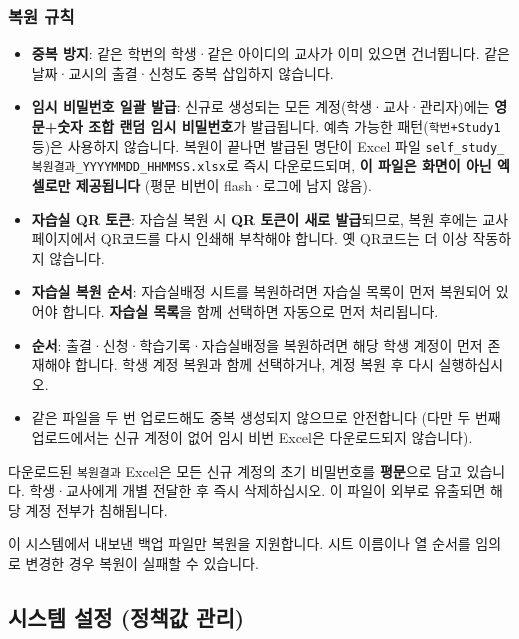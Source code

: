 \documentclass[a4paper,12pt]{article}
\begin{document}
\subsubsection{복원 규칙}

\begin{itemize}[leftmargin=1.5em]
    \item \textbf{중복 방지}: 같은 학번의 학생·같은 아이디의 교사가 이미 있으면 건너뜁니다. 같은 날짜·교시의 출결·신청도 중복 삽입하지 않습니다.
    \item \textbf{임시 비밀번호 일괄 발급}: 신규로 생성되는 모든 계정(학생·교사·관리자)에는
    \textbf{영문+숫자 조합 랜덤 임시 비밀번호}가 발급됩니다. 예측 가능한 패턴(\texttt{학번+Study1}
    등)은 사용하지 않습니다. 복원이 끝나면 발급된 명단이 Excel 파일
    \texttt{self\_study\_복원결과\_YYYYMMDD\_HHMMSS.xlsx}로 즉시 다운로드되며,
    \textbf{이 파일은 화면이 아닌 엑셀로만 제공됩니다} (평문 비번이 flash·로그에 남지 않음).
    \item \textbf{자습실 QR 토큰}: 자습실 복원 시 \textbf{QR 토큰이 새로 발급}되므로,
    복원 후에는 교사 페이지에서 QR코드를 다시 인쇄해 부착해야 합니다.
    옛 QR코드는 더 이상 작동하지 않습니다.
    \item \textbf{자습실 복원 순서}: 자습실배정 시트를 복원하려면 자습실 목록이 먼저 복원되어 있어야 합니다. \textbf{자습실 목록}을 함께 선택하면 자동으로 먼저 처리됩니다.
    \item \textbf{순서}: 출결·신청·학습기록·자습실배정을 복원하려면 해당 학생 계정이 먼저 존재해야 합니다. 학생 계정 복원과 함께 선택하거나, 계정 복원 후 다시 실행하십시오.
    \item 같은 파일을 두 번 업로드해도 중복 생성되지 않으므로 안전합니다 (다만 두 번째 업로드에서는 신규 계정이 없어 임시 비번 Excel은 다운로드되지 않습니다).
\end{itemize}

\begin{warnbox}
  다운로드된 \texttt{복원결과} Excel은 모든 신규 계정의 초기 비밀번호를
  \textbf{평문}으로 담고 있습니다. 학생·교사에게 개별 전달한 후
  즉시 삭제하십시오. 이 파일이 외부로 유출되면 해당 계정 전부가 침해됩니다.
\end{warnbox}

\begin{warnbox}
  이 시스템에서 내보낸 백업 파일만 복원을 지원합니다.
  시트 이름이나 열 순서를 임의로 변경한 경우 복원이 실패할 수 있습니다.
\end{warnbox}

\subsection{시스템 설정 (정책값 관리)}
\end{document}
